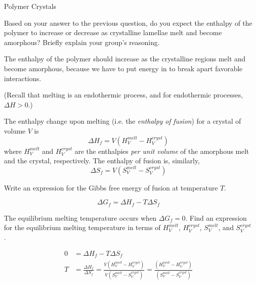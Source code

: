 \begin{activity}{Polymer Crystals}
\begin{ctqs}
	\question Based on your answer to the previous question, do you expect the enthalpy of the polymer to increase or decrease as crystalline lamellae melt and become amorphous?  Briefly explain your group's reasoning.
	
		\begin{solution}[0.75in]{}
			The enthalpy of the polymer should increase as the crystalline regions melt and become amorphous, because we have to put energy in to break apart favorable interactions.
			
			(Recall that melting is an endothermic process, and for endothermic processes, $\Delta H > 0$.) 
		\end{solution}
		
\end{ctqs}

\begin{infobox}
	The enthalpy change upon melting (i.e. the \emph{enthalpy of fusion}) for a crystal of volume $V$ is
	\begin{equation*}
		\Delta H_f = V\left( H_V^{melt} - H_V^{cryst} \right)
	\end{equation*}
	where $H_V^{melt}$ and $H_V^{cryst}$ are the enthalpies \emph{per unit volume} of the amorphous melt and the crystal, respectively.   The enthalpy of fusion is, similarly,
	\begin{equation*}
		\Delta S_f = V \left( S_V^{melt} - S_V^{cryst} \right)
	\end{equation*} 
\end{infobox}

\begin{ctqs}

	\question Write an expression for the Gibbs free energy of fusion at temperature $T$.
	
		\begin{solution}[0.75in]{}
			\begin{equation*}
				\Delta G_f = \Delta H_f - T\Delta S_f
			\end{equation*}
		\end{solution}
	
	\question The equilibrium melting temperature occurs when $\Delta G_f = 0$.  Find an expression for the equilibrium melting temperature in terms of $H_V^{melt}$, $H_V^{cryst}$, $S_V^{melt}$, and $S_V^{cryst}$. \label{\labelbase:ctq:Tmelt1}
	
		\begin{solution}[1.25in]{}
			\begin{align*}
				0 &= \Delta H_f - T\Delta S_f \\
				T &= \frac{\Delta H_f}{\Delta S_f} = \frac{V\left( H_V^{melt} - H_V^{cryst} \right)}{V \left( S_V^{melt} - S_V^{cryst} \right)} = \frac{\left( H_V^{melt} - H_V^{cryst} \right)}{ \left( S_V^{melt} - S_V^{cryst} \right)}
			\end{align*}
		\end{solution}
	

\end{ctqs}
\end{activity}

